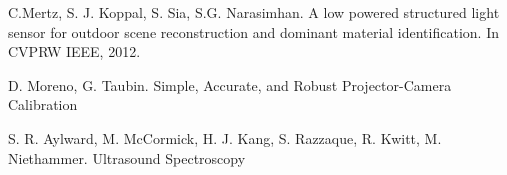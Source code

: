 \documentclass{llncs}
\begin{document}
%
%
\begin{thebibliography}{}
%
C.Mertz, S. J. Koppal, S. Sia, S.G. Narasimhan. A low powered structured light sensor for outdoor scene reconstruction and dominant material identification. In CVPRW IEEE, 2012.

D. Moreno, G. Taubin. Simple, Accurate, and Robust Projector-Camera Calibration

S. R. Aylward, M. McCormick, H. J. Kang, S. Razzaque, R. Kwitt, M. Niethammer. Ultrasound Spectroscopy

\end{thebibliography}
\end{document}
